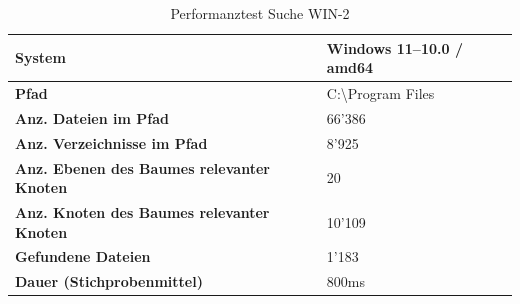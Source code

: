 \documentclass[a4paper,12pt]{report}
\begin{document}
    \begin{table}[h!]
        \centering
        \setlength{\leftmargini}{0.8cm}
        \begin{tabular}{|p{7cm}|p{5cm}|}
            \hline
            \textbf{System}                                            & Windows 11--10.0 / amd64       \\ \hline
            \textbf{Pfad}                                              & C:\textbackslash Program Files \\ \hline
            \textbf{Anz. Dateien im Pfad}                              & 66'386                         \\ \hline
            \textbf{Anz. Verzeichnisse im Pfad}                        & 8'925                          \\ \hline
            \textbf{Anz. Ebenen \newline des Baumes relevanter Knoten} & 20                             \\ \hline
            \textbf{Anz. Knoten \newline des Baumes relevanter Knoten} & 10'109                         \\ \hline
            \textbf{Gefundene Dateien}                                 & 1'183                          \\ \hline
            \textbf{Dauer (Stichprobenmittel)}                         & 800ms                          \\ \hline
        \end{tabular}
        \caption{Performanztest Suche WIN-2}\label{tab:perf-search-win-2}
    \end{table}
\end{document}
